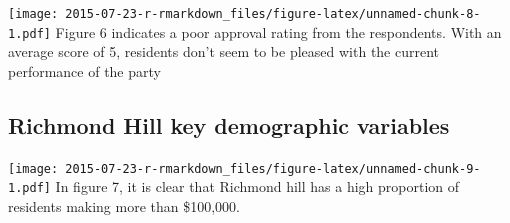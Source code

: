 \documentclass[
]{article}
\newenvironment{Shaded}{\begin{snugshade}}{\end{snugshade}}
\newcommand{\CommentTok}[1]{\textcolor[rgb]{0.56,0.35,0.01}{\textit{#1}}}
\newcommand{\DataTypeTok}[1]{\textcolor[rgb]{0.13,0.29,0.53}{#1}}
\newcommand{\KeywordTok}[1]{\textcolor[rgb]{0.13,0.29,0.53}{\textbf{#1}}}
\newcommand{\NormalTok}[1]{#1}
\newcommand{\OperatorTok}[1]{\textcolor[rgb]{0.81,0.36,0.00}{\textbf{#1}}}
\newcommand{\StringTok}[1]{\textcolor[rgb]{0.31,0.60,0.02}{#1}}
\begin{document}
\texttt{[image: 2015-07-23-r-rmarkdown\_files/figure-latex/unnamed-chunk-8-1.pdf]}
Figure 6 indicates a poor approval rating from the respondents. With an
average score of 5, residents don't seem to be pleased with the current
performance of the party

\hypertarget{richmond-hill-key-demographic-variables}{%
\subsection{Richmond Hill key demographic
variables}\label{richmond-hill-key-demographic-variables}}

\begin{Shaded}
\end{Shaded}

\texttt{[image: 2015-07-23-r-rmarkdown\_files/figure-latex/unnamed-chunk-9-1.pdf]}
In figure 7, it is clear that Richmond hill has a high proportion of
residents making more than \$100,000.
\end{document}

